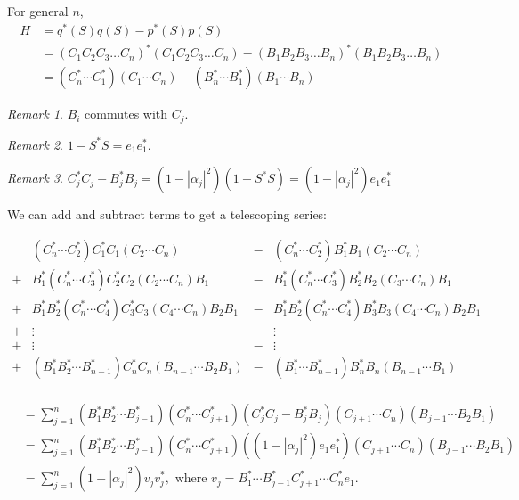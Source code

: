 \documentclass[twofold]{article}
\newcommand*\adj[1]{#1^*}
\newcommand*\abs[1]{\left \vert #1 \right\vert}
\theoremstyle{plain}
\theoremstyle{definition}
\theoremstyle{remark}
\newtheorem*{remark}{Remark}
\begin{document}
For general \(n\),  
\begin{equation*} \begin{split}
H & =  \adj{q}(S) q(S) - \adj{p}(S) p(S) \\
&= \adj{(C_1C_2C_3 \ldots C_n)}(C_1C_2C_3\ldots C_n) - \adj{(B_1B_2B_3\ldots B_n)} (B_1B_2B_3\ldots B_n) \\
& = (\adj{C_n} \cdots \adj{C_1})( C_1 \cdots C_n) - (\adj{B_n} \cdots \adj{B_1}) (B_1 \cdots B_n) 
\end{split} \end{equation*}

\begin{remark} \(B_i\) commutes with \(C_j\). \end{remark}
\begin{remark} \(1 - \adj{S} S = e_1 \adj{e_1}\). \end{remark}
\begin{remark}\(\adj{C_j} C_j - \adj{B_j} B_j  = (1 - \abs{\alpha_j}^2) (1 - \adj{S} S)  = (1 - \abs{\alpha_j}^2) e_1 \adj{e_1}\) \end{remark}

We can add and subtract terms to get a telescoping series:

\[\begin{array}{cccc}
  & (\adj{C_n} \cdots \adj{C_2}) \adj{C_1} C_1 ( C_2 \cdots C_n) & - & (\adj{C_n} \cdots \adj{C_2}) \adj{B_1} B_1 (C_2 \cdots C_n) \\
 + & \adj{B_1} (\adj{C_n} \cdots \adj{C_3}) \adj{C_2} C_2( C_2 \cdots C_n) B_1 & -& \adj{B_1}(\adj{C_n} \cdots \adj{C_3}) \adj{B_2} B_2(C_3 \cdots C_n) B_1 \\
    + & \adj{B_1} \adj{B_2} (\adj{C_n} \cdots \adj{C_4})\adj{C_3} C_3( C_4 \cdots C_n) B_2 B_1& -& \adj{B_1} \adj{B_2}(\adj{C_n} \cdots \adj{C_4})\adj{B_3} B_3 (C_4 \cdots C_n) B_2 B_1 \\
 + & \vdots & -& \vdots  \\
 + & \vdots & -& \vdots  \\
 + & (\adj{B_1} \adj{B_2} \cdots \adj{B_{n-1}}) \adj{C_n} C_n  (B_{n-1} \cdots  B_2 B_1) & -& (\adj{B_1} \cdots \adj{B_{n-1}})\adj{B_n} B_n (B_{n-1} \cdots B_1) \\
\end{array}\]

\begin{equation*} \begin{split}
& = \sum_{j = 1} ^n (\adj{B_1} \adj{B_2} \cdots \adj{B_{j-1}})(\adj{C_{n}} \cdots \adj{C_{j+1}}) (\adj{C_j} C_j - \adj{B_j} B_j) (C_{j+1} \cdots C_n) (B_{j-1} \cdots B_2 B_1) \\
& = \sum_{j = 1} ^n (\adj{B_1} \adj{B_2} \cdots \adj{B_{j-1}})(\adj{C_{n}} \cdots \adj{C_{j+1}}) ((1-\abs{\alpha_j}^2) e_1 \adj{e_1}) (C_{j+1} \cdots C_n) (B_{j-1} \cdots B_2 B_1) \\
& =  \sum_{j=1} ^n (1-\abs{\alpha_j}^2) v_j \adj{v_j}, \text{ where } v_j = \adj{B_1} \cdots \adj{B_{j-1}} \adj{C_{j+1}} \cdots \adj{C_n} e_1.
\end{split}\end{equation*}
\end{document}
